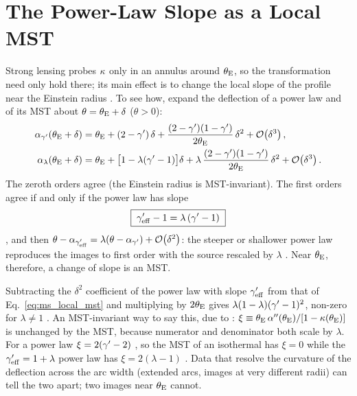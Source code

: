 \section{The Power-Law Slope as a Local MST}
\label{sec:ms_local}

Strong lensing probes $\kappa$ only in an annulus around $\theta_{\mathrm{E}}$, so the
transformation need only hold there; its main effect is to change the local
slope of the profile near the Einstein radius \citep{schneider_2014_multiplane}.
To see how, expand the deflection of a power law and of its MST about
$\theta=\theta_{\mathrm{E}}+\delta$ ($\theta>0$):
\begin{align}
    \alpha_{\gamma'}(\theta_{\mathrm{E}}+\delta) &= \theta_{\mathrm{E}}+(2-\gamma')\,\delta
      +\frac{(2-\gamma')(1-\gamma')}{2\theta_{\mathrm{E}}}\,\delta^2+\mathcal{O}\!\left(\delta^3\right),
    \label{eq:ms_local_pl}\\
    \alpha_{\lambda}(\theta_{\mathrm{E}}+\delta) &= \theta_{\mathrm{E}}+\bigl[1-\lambda(\gamma'-1)\bigr]\delta
      +\lambda\,\frac{(2-\gamma')(1-\gamma')}{2\theta_{\mathrm{E}}}\,\delta^2+\mathcal{O}\!\left(\delta^3\right).
    \label{eq:ms_local_mst}
\end{align}
The zeroth orders agree (the Einstein radius is MST-invariant).  The first
orders agree if and only if the power law has slope
\begin{equation}
    \boxed{\;\gamma'_{\rm eff}-1=\lambda\,(\gamma'-1)\;}
    \label{eq:ms_local}
\end{equation}
, and then $\theta-\alpha_{\gamma'_{\rm eff}}=\lambda(\theta-\alpha_{\gamma'})+\mathcal{O}\!\left(\delta^2\right)$:
the steeper or shallower power law reproduces the images to first order with
the source rescaled by $\lambda$ .  Near $\theta_{\mathrm{E}}$, therefore,
a change of slope is an MST.

\begin{derivation}
Subtracting the $\delta^2$ coefficient of the power law with slope
$\gamma'_{\rm eff}$ from that of Eq.~\eqref{eq:ms_local_mst} and multiplying by
$2\theta_{\mathrm{E}}$ gives $\lambda(1-\lambda)(\gamma'-1)^2$, non-zero for $\lambda\neq1$
.  An MST-invariant way to say this, due to
\citet{kochanek_2020}:
$\xi\equiv\theta_{\mathrm{E}}\,\alpha''(\theta_{\mathrm{E}})/[1-\kappa(\theta_{\mathrm{E}})]$ is unchanged by
the MST, because numerator and denominator both scale by $\lambda$.  For a
power law $\xi=2(\gamma'-2)$ , so the MST of an isothermal has $\xi=0$
while the $\gamma'_{\rm eff}=1+\lambda$ power law has $\xi=2(\lambda-1)$
.  Data that resolve the curvature of the deflection across the arc
width (extended arcs, images at very different radii) can tell the two apart;
two images near $\theta_{\mathrm{E}}$ cannot.
\end{derivation}

